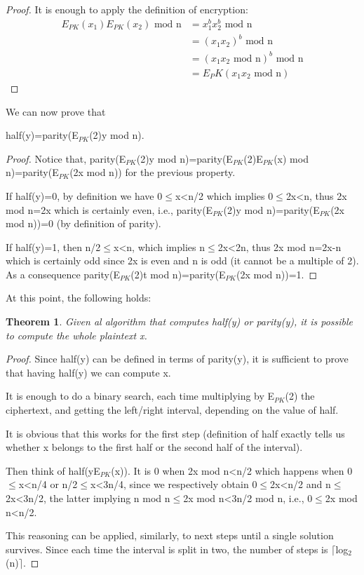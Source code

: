 \documentclass[a4paper, 12pt]{report}
\newtheorem{theorem}{\textbf{Theorem}}
\begin{document}
\begin{proof}
	It is enough to apply the definition of encryption:
	\begin{align*}
		E_{PK}(x_1)E_{PK}(x_2) \text{ mod n} &= x_1^bx_2^b \text{ mod n}\\
		&= (x_1x_2)^b \text{ mod n}\\
		&= (x_1x_2 \text{ mod n})^b \text{ mod n}\\
		&= E_PK(x_1x_2 \text{ mod n})
	\end{align*}
\end{proof}

We can now prove that
\begin{center}
	half(y)=parity(E$_{PK}$(2)y mod n).
\end{center}
\begin{proof}
Notice that, parity(E$_{PK}$(2)y mod n)=parity(E$_{PK}$(2)E$_{PK}$(x) mod n)=parity(E$_{PK}$(2x mod n)) for the previous property.

If half(y)=0, by definition we have 0$\le$x<n/2 which implies 0$\le$2x<n, thus 2x mod n=2x which is certainly even, i.e., parity(E$_{PK}$(2)y mod n)=parity(E$_{PK}$(2x mod n))=0 (by definition of parity).

If half(y)=1, then n/2$\le$x<n, which implies n$\le$2x<2n, thus 2x mod n=2x-n which is certainly odd since 2x is even and n is odd (it cannot be a multiple of 2). As a consequence parity(E$_{PK}$(2)t mod n)=parity(E$_{PK}$(2x mod n))=1.

\end{proof}

At this point, the following holds:
\begin{theorem}
	Given al algorithm that computes half(y) or parity(y), it is possible to compute the whole plaintext x.
\end{theorem}

\begin{proof}
	Since half(y) can be defined in terms of parity(y), it is sufficient to prove that having half(y) we can compute x.
	
	It is enough to do a binary search, each time multiplying by E$_{PK}$(2) the ciphertext, and getting the left/right interval, depending on the value of half.
	
	It is obvious that this works for the first step (definition of half exactly tells us whether x belongs to the first half or the second half of the interval).
	
	Then think of half(yE$_{PK}$(x)). It is 0 when 2x mod n<n/2 which happens when 0$\le$x<n/4 or n/2$\le$x<3n/4, since we respectively obtain 0$\le$2x<n/2 and n$\le$2x<3n/2, the latter implying n mod n$\le$2x mod n<3n/2 mod n, i.e., 0$\le$2x mod n<n/2.
	
	This reasoning can be applied, similarly, to next steps until a single solution survives. Since each time the interval is split in two, the number of steps is $\lceil$log$_2$(n)$\rceil$. 
\end{proof}
\end{document}
